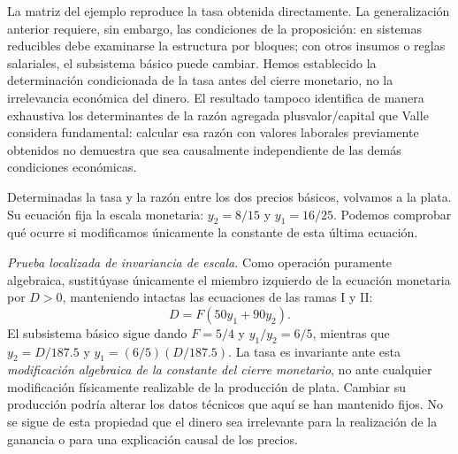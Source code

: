 \documentclass[10pt,twoside]{article}
\begin{document}
La matriz del ejemplo reproduce la tasa obtenida directamente. La generalización anterior requiere, sin embargo, las condiciones de la proposición: en sistemas reducibles debe examinarse la estructura por bloques; con otros insumos o reglas salariales, el subsistema básico puede cambiar. Hemos establecido la determinación condicionada de la tasa antes del cierre monetario, no la irrelevancia económica del dinero. El resultado tampoco identifica de manera exhaustiva los determinantes de la razón agregada plusvalor/capital que Valle considera fundamental: calcular esa razón con valores laborales previamente obtenidos no demuestra que sea causalmente independiente de las demás condiciones económicas.

Determinadas la tasa y la razón entre los dos precios básicos, volvamos a la plata. Su ecuación fija la escala monetaria: $y_2=8/15$ y $y_1=16/25$. Podemos comprobar qué ocurre si modificamos únicamente la constante de esta última ecuación.

\noindent\textit{Prueba localizada de invariancia de escala.} Como operación puramente algebraica, sustitúyase únicamente el miembro izquierdo de la ecuación monetaria por $D>0$, manteniendo intactas las ecuaciones de las ramas I y II:
\[
D=F(50y_1+90y_2).
\]
El subsistema básico sigue dando $F=5/4$ y $y_1/y_2=6/5$, mientras que $y_2=D/187.5$ y $y_1=(6/5)(D/187.5)$. La tasa es invariante ante esta \emph{modificación algebraica de la constante del cierre monetario}, no ante cualquier modificación físicamente realizable de la producción de plata. Cambiar su producción podría alterar los datos técnicos que aquí se han mantenido fijos.
 No se sigue de esta propiedad que el dinero sea irrelevante para la realización de la ganancia o para una explicación causal de los precios.
\end{document}
